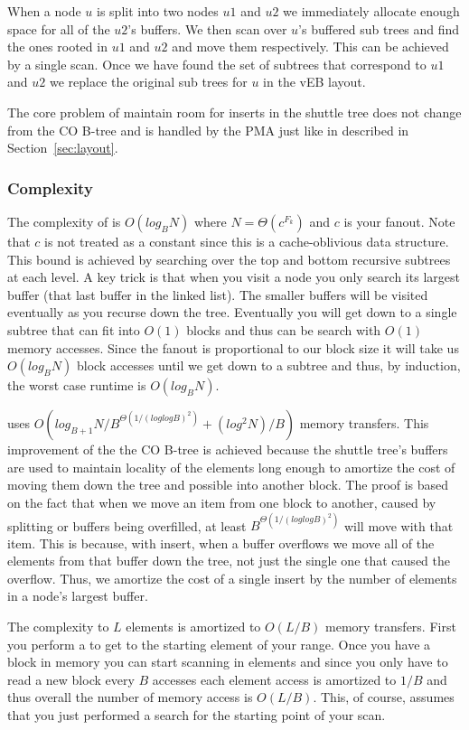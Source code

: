 \documentclass{style}
\begin{document}
When a node $u$ is split into two nodes $u1$ and $u2$ we immediately allocate
enough space for all of the $u2$'s buffers. We then scan over $u$'s buffered
sub trees and find the ones rooted in $u1$ and $u2$ and move them
respectively. This can be achieved by a single scan. Once we have found the
set of subtrees that correspond to $u1$ and $u2$ we replace the original sub
trees for $u$ in the vEB layout.

The core problem of maintain room for inserts in the shuttle tree does not
change from the CO B-tree and is handled by the PMA just like in described in
Section~\ref{sec:layout}.

\subsubsection{Complexity}

The complexity of \Search is $O(log_B N)$ where $N = \Theta(c^{F_k})$ and $c$
is your fanout. Note that $c$ is not treated as a constant since this is a
cache-oblivious data structure. This bound is achieved by searching over the
top and bottom recursive subtrees at each level. A key trick is that when you
visit a node you only search its largest buffer (that last buffer in the
linked list). The smaller buffers will be visited eventually as you recurse
down the tree. Eventually you will get down to a single subtree that can fit
into $O(1)$ blocks and thus can be search with $O(1)$ memory accesses. Since
the fanout is proportional to our block size it will take us $O(log_B N)$
block accesses until we get down to a subtree and thus, by induction, the
worst case runtime is $O(log_B N)$.

\Insert uses $O(log_{B+1} N / B^{\Theta(1/(loglogB)^2)} + (log^2 N) / B)$
memory transfers. This improvement of the the CO B-tree is achieved because
the shuttle tree's buffers are used to maintain locality of the elements long
enough to amortize the cost of moving them down the tree and possible into
another block. The proof is based on the fact that when we move an item from
one block to another, caused by splitting or buffers being overfilled, at
least $B^{\Theta(1/(loglogB)^2)}$ will move with that item. This is because,
with insert, when a buffer overflows we move all of the elements from that
buffer down the tree, not just the single one that caused the overflow. Thus,
we amortize the cost of a single insert by the number of elements in a node's
largest buffer.

The complexity to \Scan $L$ elements is amortized to $O(L/B)$ memory
transfers. First you perform a \Search to get to the starting element of your
range. Once you have a block in memory you can start scanning in elements and
since you only have to read a new block every $B$ accesses each element access
is amortized to $1/B$ and thus overall the number of memory access is
$O(L/B)$. This, of course, assumes that you just performed a search for the
starting point of your scan.
\end{document}
